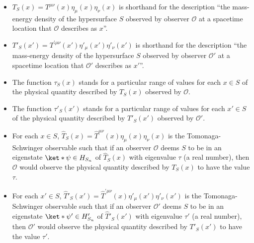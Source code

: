 \documentclass[12pt]{report}
\begin{document}
\begin{itemize}
\item $T_S(x)={T}^{\mu\nu}(x)\eta_{\mu}(x)\eta_{\nu}(x)$ is shorthand for the description ``the mass-energy density of the hypersurface $S$ observed by observer $\mathcal{O}$ at a spacetime location that $\mathcal{O}$ describes as $x$''. 
\item $T'_S(x')={T}^{\prime\mu\nu}(x')\eta'_{\mu}(x')\eta'_{\nu}(x')$ is shorthand for the description ``the mass-energy density of the hypersurface $S$ observed by observer $\mathcal{O}'$ at a spacetime location that $\mathcal{O}'$ describes as $x'$''. %
% 
\item The function $\tau_S(x)$ stands for a particular range of values for each $x\in S$ of the physical quantity described by $T_S(x)$ observed by $\mathcal{O}$. 
\item The function $\tau'_S(x')$ stands for a particular range of values for each $x'\in S$ of the physical quantity described by $T'_S(x')$ observed by $\mathcal{O}'$.  %
%
\item For each $x\in S$, $\hat{T}_S(x)=\hat{T}^{\mu\nu}(x)\eta_{\mu}(x)\eta_{\nu}(x)$ is the Tomonaga-Schwinger observable  such that if an observer $\mathcal{O}$ deems $S$ to be in an eigenstate $\ket*{\psi}\in H_{S_n}$ of  $\hat{T}_S(x)$ with eigenvalue $\tau$ (a real number), then  $\mathcal{O}$ would observe the physical quantity described by  $T_S(x)$ to have the value $\tau$. 
\item For each $x'\in S$, $\hat{T}'_S(x')=\hat{T}^{\prime\mu\nu}(x)\eta'_{\mu}(x')\eta'_{\nu}(x')$ is the Tomonaga-Schwinger observable  such that if an observer $\mathcal{O}'$ deems $S$ to be in an eigenstate $\ket*{\psi'}\in H'_{S_n}$ of  $\hat{T}'_S(x')$ with eigenvalue $\tau'$ (a real number), then  $\mathcal{O}'$ would observe the physical quantity described by  $T'_S(x')$ to have the value $\tau'$.  %
%
\end{itemize}
\end{document}
